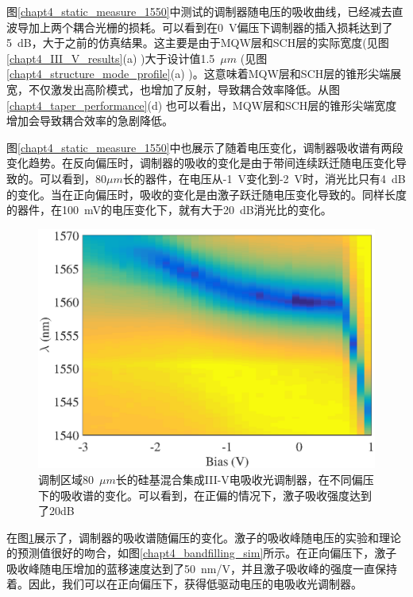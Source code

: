 图\ref{chapt4_static_measure_1550}中测试的调制器随电压的吸收曲线，已经减去直波导加上两个耦合光栅的损耗。可以看到在0~V偏压下调制器的插入损耗达到了5~dB，大于之前的仿真结果。这主要是由于MQW层和SCH层的实际宽度(见图\ref{chapt4_III_V_results}(a) )大于设计值1.5~$\mu m$ (见图\ref{chapt4_structure_mode_profile}(a) )。这意味着MQW层和SCH层的锥形尖端展宽，不仅激发出高阶模式，也增加了反射，导致耦合效率降低。从图\ref{chapt4_taper_performance}(d) 也可以看出，MQW层和SCH层的锥形尖端宽度增加会导致耦合效率的急剧降低。

图\ref{chapt4_static_measure_1550}中也展示了随着电压变化，调制器吸收谱有两段变化趋势。在反向偏压时，调制器的吸收的变化是由于带间连续跃迁随电压变化导致的。可以看到，80$\mu m$长的器件，在电压从-1~V变化到-2~V时，消光比只有4~dB的变化。当在正向偏压时，吸收的变化是由激子跃迁随电压变化导致的。同样长度的器件，在100~mV的电压变化下，就有大于20~dB消光比的变化。

\begin{figure}[htb]
	\centering
	\includegraphics[width=14cm]{./Pictures/chapt4_static_measure_absorption_spectra.eps}
	\caption{调制区域80~$\mu m$长的硅基混合集成III-V电吸收光调制器，在不同偏压下的吸收谱的变化。可以看到，在正偏的情况下，激子吸收强度达到了20dB}
	\label{chapt4_static_measure_absorption_spectra}
\end{figure}
在图\ref{chapt4_static_measure_absorption_spectra}展示了，调制器的吸收谱随偏压的变化。激子的吸收峰随电压的实验和理论的预测值很好的吻合，如图\ref{chapt4_bandfilling_sim}所示。在正向偏压下，激子吸收峰随电压增加的蓝移速度达到了50~nm/V，并且激子吸收峰的强度一直保持着。因此，我们可以在正向偏压下，获得低驱动电压的电吸收光调制器。

